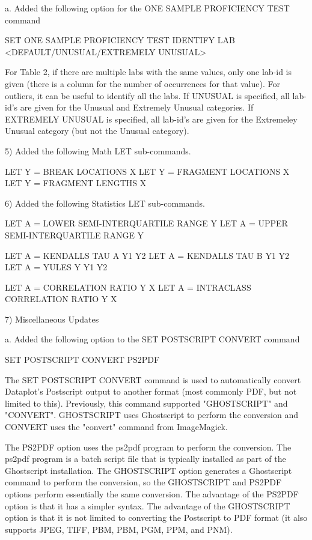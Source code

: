      a. Added the following option for the ONE SAMPLE PROFICIENCY TEST
         command

            SET ONE SAMPLE PROFICIENCY TEST IDENTIFY LAB
                <DEFAULT/UNUSUAL/EXTREMELY UNUSUAL>

         For Table 2, if there are multiple labs with the same values,
         only one lab-id is given (there is a column for the number of
         occurrences for that value).  For outliers, it can be useful
         to identify all the labs.  If UNUSUAL is specified, all lab-id's
         are given for the Unusual and Extremely Unusual categories.  If
         EXTREMELY UNUSUAL is specified, all lab-id's are given for the
         Extremeley Unusual category (but not the Unusual category).

 5) Added the following Math LET sub-commands.

      LET Y = BREAK LOCATIONS X
      LET Y = FRAGMENT LOCATIONS X
      LET Y = FRAGMENT LENGTHS X

 6) Added the following Statistics LET sub-commands.

      LET A = LOWER SEMI-INTERQUARTILE RANGE Y
      LET A = UPPER SEMI-INTERQUARTILE RANGE Y

      LET A = KENDALLS TAU A  Y1 Y2
      LET A = KENDALLS TAU B  Y1 Y2
      LET A = YULES Y  Y1 Y2

      LET A = CORRELATION RATIO Y X
      LET A = INTRACLASS CORRELATION RATIO Y X

 7) Miscellaneous Updates

    a. Added the following option to the SET POSTSCRIPT CONVERT
       command

          SET POSTSCRIPT CONVERT PS2PDF

       The SET POSTSCRIPT CONVERT command is used to automatically
       convert Dataplot's Postscript output to another format (most
       commonly PDF, but not limited to this).  Previously, this
       command supported "GHOSTSCRIPT" and "CONVERT".  GHOSTSCRIPT
       uses Ghostscript to perform the conversion and CONVERT uses
       the "convert" command from ImageMagick.

       The PS2PDF option uses the ps2pdf program to perform the
       conversion.  The ps2pdf program is a batch script file that
       is typically installed as part of the Ghostscript installation.
       The GHOSTSCRIPT option generates a Ghostscript command to
       perform the conversion, so the GHOSTSCRIPT and PS2PDF options
       perform essentially the same conversion.  The advantage of the
       PS2PDF option is that it has a simpler syntax.  The advantage
       of the GHOSTSCRIPT option is that it is not limited to
       converting the Postscript to PDF format (it also supports
       JPEG, TIFF, PBM, PBM, PGM, PPM, and PNM).

